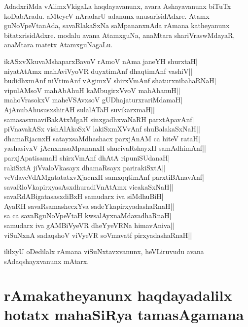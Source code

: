 AdadxriMda vAlimxVkigaLa haqdayavanunx, avara Ashayavanunx biTuTx koDabAradu. aMteyeV nAradarU adanunx anusarisidAdxre. Atamx guNoVpeVtanAda, savaRlakaSxNa saMpananxnAda rAmana katheyanunx bitatxrisidAdxre. modalu avana AtamxguNa, anaMtara shariVraswMdayaR, anaMtara matetx AtamxguNagaLu. 

\begin{shloka} 
ikASxvXkuvaMshaparxBavoV rAmoV nAma janeYH shurxtaH|\label{196}\\ 
niyatAtAmx mahAviVyoVR duyxtimAnf dhaqtimAnf vashiV||\\ 
budidhxmAnf niVtimAnf vAgimxV shirxVmAnf shaturxnibahaRNaH|\\ 
vipulAMsoV mahAbAhuH kaMbugirxVvoV mahAhanuH||\\ 
mahoVrasokxV maheVSAvxsoV gUDhajaturxrariMdamaH|\\ 
AjAnubAhususxshirAH sulalATaH suvikarxmaH||\\ 
samasasxmaviBakAtxMgaH sinxgadhxvaNaRH parxtApavAnf|\\ 
piVnavakASx vishAlAkoSxV lakiSxmXVvAnf shuBalakaSxNaH||\\ 
dhamaRjacnxH satayxsaMdhashacx parxjAnAM ca hiteV rataH|\\ 
yashasivxV jAcnxnasaMpananxH shucivaRshayxH samAdhimAnf||\\ 
parxjApatisamaH shirxVmAnf dhAtA ripuniSUdanaH|\\ 
rakiSxtA jiVvaloVkasayx dhamaRsayx parirakiSxtA||\\ 
veVdaveVdAMgatatatxvXjacnxH samxqqtimAnf parxtiBAnavAnf|\\ 
savaRloVkapirxyasAsxdhuradiVnAtAmx vicakaSxNaH||\\ 
savaRdABigatasasxdiBxH samudarx iva siMdhuBiH|\\ 
AyaRH savaRsamashecxYva sadeYkapirxyadashaRnaH||\\ 
sa ca savaRguNoVpeVtaH kwsalAyxnaMdavadhaRnaH|\\ 
samudarx iva gAMBiVyeVR dheYyeVRNa himavAniva||\\ 
viSuNxnA sadaqshoV viVyeVR soVmavatf pirxyadashaRnaH|| 
\end{shloka}

ililxyU oDedilalx rAmana viSuNxtavxvanunx, heVLiruvudu avana sAdaqshayxvanunx mAtarx. 

\section*{rAmakatheyanunx haqdayadalilx hotatx mahaSiRya tamasAgamana} 

